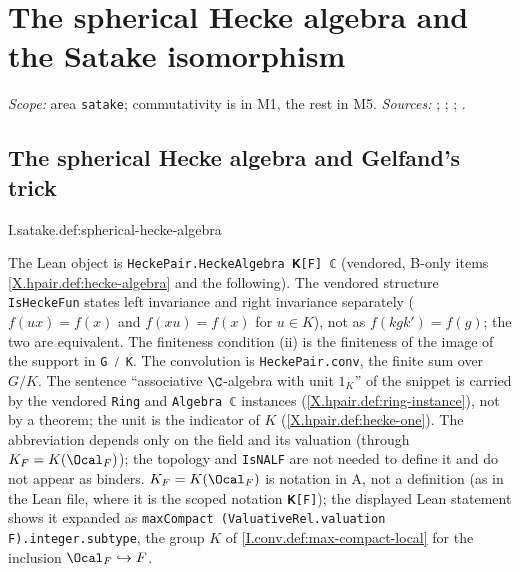 
\chapter{The spherical Hecke algebra and the Satake isomorphism}\label{ch:ch-1-01-spherical}

\noindent\emph{Scope:} area \texttt{satake}; commutativity is in M1, the rest in M5. \emph{Sources:} \cite{Sat}; \cite[§9, Proposition~37]{BumpH}; \cite[§9]{Cas-p}; \cite{Corv-ptI-7}.

\section{The spherical Hecke algebra and Gelfand's trick}
\begin{definition}
\end{definition}
\begin{tfformal}{I.satake.def:spherical-hecke-algebra}
\begin{tffidelity}
The Lean object is \texttt{HeckePair.HeckeAlgebra 𝐊[F] ℂ} (vendored, B-only items \cref{X.hpair.def:hecke-algebra} and the following). The vendored structure \texttt{IsHeckeFun} states left invariance and right invariance separately ($f(ux)=f(x)$ and $f(xu)=f(x)$ for $u\in K$), not as $f(kgk')=f(g)$; the two are equivalent. The finiteness condition (ii) is the finiteness of the image of the support in \texttt{G ⧸ K}. The convolution is \texttt{HeckePair.conv}, the finite sum over $G/K$. The sentence ``associative $\C$-algebra with unit $1_K$'' of the snippet is carried by the vendored \texttt{Ring} and \texttt{Algebra ℂ} instances (\cref{X.hpair.def:ring-instance}), not by a theorem; the unit is the indicator of $K$ (\cref{X.hpair.def:hecke-one}). The abbreviation depends only on the field and its valuation (through $K_F=K(\Ocal_F)$); the topology and \texttt{IsNALF} are not needed to define it and do not appear as binders. $K_F=K(\Ocal_F)$ is notation in A, not a definition (as in the Lean file, where it is the scoped notation \texttt{𝐊[F]}); the displayed Lean statement shows it expanded as \texttt{maxCompact (ValuativeRel.valuation F).integer.subtype}, the group $K$ of \cref{I.conv.def:max-compact-local} for the inclusion $\Ocal_F\hookrightarrow F$.
\end{tffidelity}
\end{tfformal}

